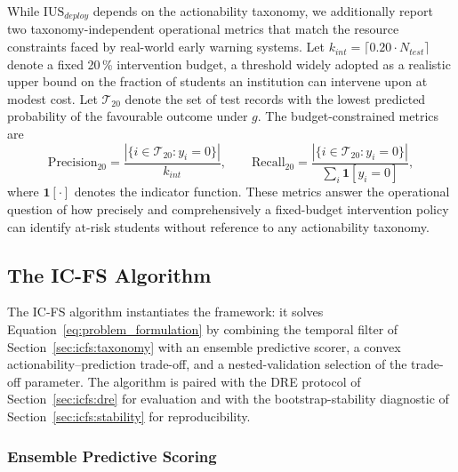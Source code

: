 \documentclass[a4paper,fleqn]{cas-sc}
\begin{document}
While $\mathrm{IUS}_{deploy}$ depends on the actionability taxonomy, we additionally report two taxonomy-independent operational metrics that match the resource constraints faced by real-world early warning systems. Let $k_{int} = \lceil 0.20 \cdot N_{test} \rceil$ denote a fixed 20\,\% intervention budget, a threshold widely adopted as a realistic upper bound on the fraction of students an institution can intervene upon at modest cost. Let $\mathcal{T}_{20}$ denote the set of test records with the lowest predicted probability of the favourable outcome under $g$. The budget-constrained metrics are
\begin{equation}
    \mathrm{Precision}_{20}
    = \frac{|\{i \in \mathcal{T}_{20} : y_i = 0\}|}{k_{int}},
    \qquad
    \mathrm{Recall}_{20}
    = \frac{|\{i \in \mathcal{T}_{20} : y_i = 0\}|}{\sum_i \mathbf{1}[y_i = 0]},
    \label{eq:budget_metrics}
\end{equation}
where $\mathbf{1}[\cdot]$ denotes the indicator function. These metrics answer the operational question of how precisely and comprehensively a fixed-budget intervention policy can identify at-risk students without reference to any actionability taxonomy.


\subsection{The IC-FS Algorithm}
\label{sec:icfs:algorithm}

The IC-FS algorithm instantiates the framework: it solves Equation~\eqref{eq:problem_formulation} by combining the temporal filter of Section~\ref{sec:icfs:taxonomy} with an ensemble predictive scorer, a convex actionability--prediction trade-off, and a nested-validation selection of the trade-off parameter. The algorithm is paired with the DRE protocol of Section~\ref{sec:icfs:dre} for evaluation and with the bootstrap-stability diagnostic of Section~\ref{sec:icfs:stability} for reproducibility.

\subsubsection{Ensemble Predictive Scoring}
\label{sec:icfs:pred_score}
\end{document}
